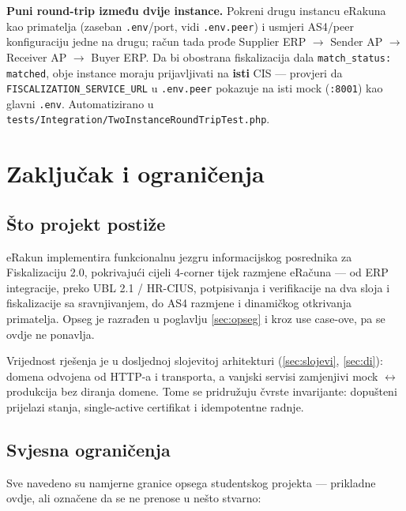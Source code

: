 \documentclass[11pt,a4paper]{article}
\renewenvironment{leftbar}{%
  \def\FrameCommand{\hspace{0pt}\vrule width 2pt\hspace{8pt}}%
  \MakeFramed{\advance\hsize-\width \FrameRestore}}%
 {\endMakeFramed}
\begin{document}
\begin{leftbar}
\textbf{Puni round-trip između dvije instance.} Pokreni drugu instancu eRakuna kao
primatelja (zaseban \texttt{.env}/port, vidi \texttt{.env.peer}) i usmjeri AS4/peer
konfiguraciju jedne na drugu; račun tada prođe Supplier ERP $\rightarrow$ Sender AP
$\rightarrow$ Receiver AP $\rightarrow$ Buyer ERP. Da bi obostrana fiskalizacija dala
\texttt{match\_status: matched}, obje instance moraju prijavljivati na \textbf{isti}
CIS — provjeri da \texttt{FISCALIZATION\_SERVICE\_URL} u \texttt{.env.peer} pokazuje na
isti mock (\texttt{:8001}) kao glavni \texttt{.env}. Automatizirano u
\texttt{tests/Integration/TwoInstanceRoundTripTest.php}.
\end{leftbar}

\section{Zaključak i ograničenja}\label{sec:zakljucak}

\subsection{Što projekt postiže}

eRakun implementira funkcionalnu jezgru informacijskog posrednika za Fiskalizaciju 2.0,
pokrivajući cijeli 4-corner tijek razmjene eRačuna — od ERP integracije, preko UBL 2.1 / HR-CIUS,
potpisivanja i verifikacije na dva sloja i fiskalizacije sa sravnjivanjem, do AS4 razmjene i
dinamičkog otkrivanja primatelja. Opseg je razrađen u poglavlju \ref{sec:opseg} i kroz use
case-ove, pa se ovdje ne ponavlja.

Vrijednost rješenja je u dosljednoj slojevitoj arhitekturi (\ref{sec:slojevi}, \ref{sec:di}):
domena odvojena od HTTP-a i transporta, a vanjski servisi zamjenjivi mock $\leftrightarrow$
produkcija bez diranja domene. Tome se pridružuju čvrste invarijante: dopušteni prijelazi
stanja, single-active certifikat i idempotentne radnje.

\subsection{Svjesna ograničenja}

Sve navedeno su namjerne granice opsega studentskog projekta — prikladne ovdje, ali
označene da se ne prenose u nešto stvarno:
\end{document}
